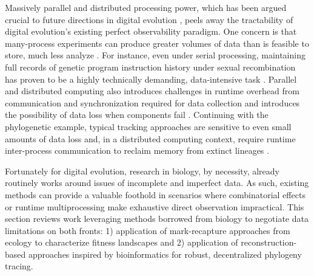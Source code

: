 Massively parallel and distributed processing power, which has been argued crucial to future directions in digital evolution \citep{moreno2022best,taylor2016open}, peels away the tractability of digital evolution's existing perfect observability paradigm.
One concern is that many-process experiments can produce greater volumes of data than is feasible to store, much less analyze \citep{klasky2021data}.
For instance, even under serial processing, maintaining full records of genetic program instruction history under sexual recombination has proven to be a highly technically demanding, data-intensive task \citep{mcphee2016using}.
Parallel and distributed computing also introduces challenges in runtime overhead from communication and synchronization required for data collection and introduces the possibility of data loss when components fail \citep{snir2014addressing}.
Continuing with the phylogenetic example, typical tracking approaches are sensitive to even small amounts of data loss and, in a distributed computing context, require runtime inter-process communication to reclaim memory from extinct lineages \citep{moreno2024algorithms}.

Fortunately for digital evolution, research in biology, by necessity, already routinely works around issues of incomplete and imperfect data.
As such, existing methods can provide a valuable foothold in scenarios where combinatorial effects or runtime multiprocessing make exhaustive direct observation impractical.
This section reviews work leveraging methods borrowed from biology to negotiate data limitations on both fronts: 1) application of mark-recapture approaches from ecology to characterize fitness landscapes and 2) application of reconstruction-based approaches inspired by bioinformatics for robust, decentralized phylogeny tracing.






